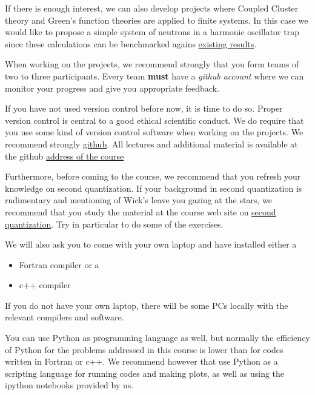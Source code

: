 \documentclass[%
twoside,                 %
final,                   %
10pt]{article}
\begin{document}
\noindent
If there is enough interest, we can also develop projects where Coupled Cluster theory and Green's function theories are applied to finite systems. In this case we would like to propose a simple system of neutrons in a harmonic oscillator trap since these calculations can be benchmarked agains \href{{http://journals.aps.org/prc/abstract/10.1103/PhysRevC.84.044306}}{existing results}. 


When working on the projects, we recommend strongly that you form teams of two to three participants. Every team
\textbf{must} have a \emph{github account} where we can monitor your progress and give you appropriate feedback.

If you have not used version control before now, it is time to do so. 
Proper version control is central to a good ethical scientific conduct. 
We do require that you use some kind of version control software when working on the projects. We recommend strongly \href{{https://github.com/}}{github}. All lectures and additional material is available at the github \href{{http://nucleartalent.github.io/Course2ManyBodyMethods/doc/web/course.html}}{address of the course}

Furthermore, before coming to the course, we recommend that you refresh your knowledge on second quantization.
If your background in second quantization is rudimentary and mentioning of Wick's leave you gazing at the stars,
we recommend that you study the material at the course web site on \href{{http://nucleartalent.github.io/Course2ManyBodyMethods/doc/pub/secondquant/html/secondquant-bs.html}}{second quantization}. Try in particular to do some of the exercises.

We will also ask  you to come with your own laptop and have installed either a
\begin{itemize}
\item Fortran compiler or a 

\item c++ compiler
\end{itemize}

\noindent
If you do not have your own laptop, there will be some PCs locally with the relevant compilers and software. 

You can use Python as programming language as well, but normally the efficiency of Python for the problems addressed in this course is lower than for codes written in Fortran or c++. We recommend however that use Python as a scripting language for running codes and making plots, as well as using the ipython notebooks provided by us.  
\end{document}
